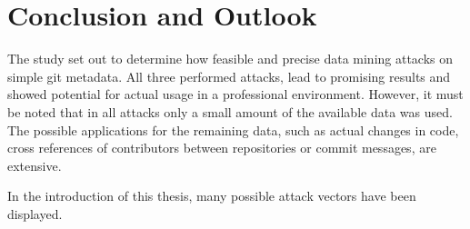 \chapter{Conclusion and Outlook}

The study set out to determine how feasible and precise data mining attacks on simple git metadata.
All three performed attacks, lead to promising results and showed potential for actual usage in a professional environment.
However, it must be noted that in all attacks only a small amount of the available data was used.
The possible applications for the remaining data, such as actual changes in code, cross references of contributors between repositories or commit messages, are extensive.


In the introduction of this thesis, many possible attack vectors have been displayed.
